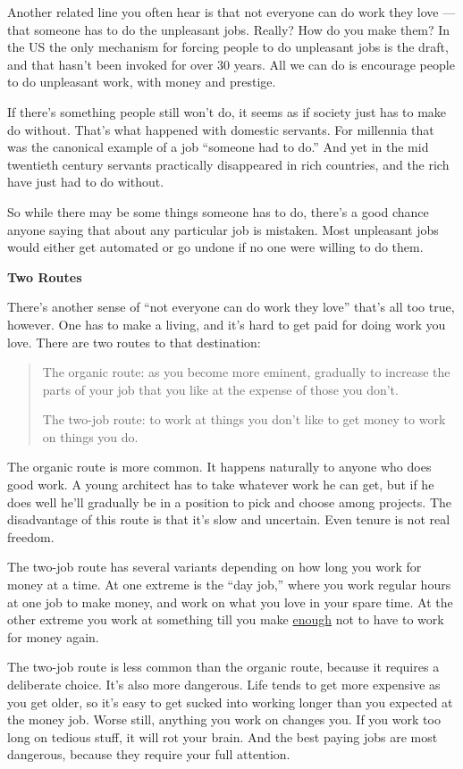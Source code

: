 Another related line you often hear is that not everyone can do work
they love --- that someone has to do the unpleasant jobs. Really? How do
you make them? In the US the only mechanism for forcing people to do
unpleasant jobs is the draft, and that hasn't been invoked for over 30
years. All we can do is encourage people to do unpleasant work, with
money and prestige.

If there's something people still won't do, it seems as if society just
has to make do without. That's what happened with domestic servants. For
millennia that was the canonical example of a job ``someone had to do.''
And yet in the mid twentieth century servants practically disappeared in
rich countries, and the rich have just had to do without.

So while there may be some things someone has to do, there's a good
chance anyone saying that about any particular job is mistaken. Most
unpleasant jobs would either get automated or go undone if no one were
willing to do them.

\textbf{Two Routes}

There's another sense of ``not everyone can do work they love'' that's
all too true, however. One has to make a living, and it's hard to get
paid for doing work you love. There are two routes to that destination:

\begin{quote}
The organic route: as you become more eminent, gradually to increase the
parts of your job that you like at the expense of those you don't.

The two-job route: to work at things you don't like to get money to work
on things you do.
\end{quote}

The organic route is more common. It happens naturally to anyone who
does good work. A young architect has to take whatever work he can get,
but if he does well he'll gradually be in a position to pick and choose
among projects. The disadvantage of this route is that it's slow and
uncertain. Even tenure is not real freedom.

The two-job route has several variants depending on how long you work
for money at a time. At one extreme is the ``day job,'' where you work
regular hours at one job to make money, and work on what you love in
your spare time. At the other extreme you work at something till you
make \href{wealth.html}{enough} not to have to work for money again.

The two-job route is less common than the organic route, because it
requires a deliberate choice. It's also more dangerous. Life tends to
get more expensive as you get older, so it's easy to get sucked into
working longer than you expected at the money job. Worse still, anything
you work on changes you. If you work too long on tedious stuff, it will
rot your brain. And the best paying jobs are most dangerous, because
they require your full attention.

